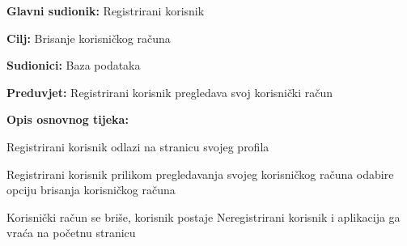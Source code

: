 				
				\noindent {}
				\begin{packed_item}
					
					\item \textbf{Glavni sudionik:} Registrirani korisnik
					\item  \textbf{Cilj:} Brisanje korisničkog računa
					\item  \textbf{Sudionici:} Baza podataka
					\item  \textbf{Preduvjet:} Registrirani korisnik pregledava svoj korisnički račun
					
					\item  \textbf{Opis osnovnog tijeka:}
					\item[] \begin{packed_enum}
						\item Registrirani korisnik odlazi na stranicu svojeg profila
						\item Registrirani korisnik prilikom pregledavanja svojeg korisničkog računa odabire opciju brisanja korisničkog računa
						\item Korisnički račun se briše, korisnik postaje Neregistrirani korisnik i aplikacija ga vraća na početnu stranicu
					\end{packed_enum}
				\end{packed_item}
				
